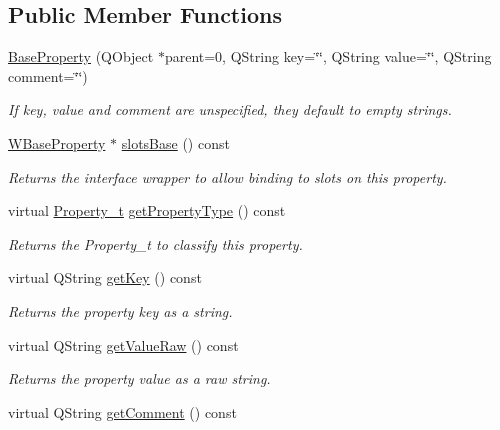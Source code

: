 \subsection*{Public Member Functions}
\begin{DoxyCompactItemize}
\item 
\hyperlink{class_base_property_aca37cc72811875adbb8a5f5f91e521a2}{Base\-Property} (Q\-Object $\ast$parent=0, Q\-String key=\char`\"{}\char`\"{}, Q\-String value=\char`\"{}\char`\"{}, Q\-String comment=\char`\"{}\char`\"{})
\begin{DoxyCompactList}\small\item\em If key, value and comment are unspecified, they default to empty strings. \end{DoxyCompactList}\item 
\hyperlink{class_w_base_property}{W\-Base\-Property} $\ast$ \hyperlink{class_base_property_a032130dea4bd72ee8dd80dcfa7d5f37a}{slots\-Base} () const 
\begin{DoxyCompactList}\small\item\em Returns the interface wrapper to allow binding to slots on this property. \end{DoxyCompactList}\item 
virtual \hyperlink{group___property_classes_ga38f1ccddda12c7cb50b868c9f789ee37}{Property\-\_\-t} \hyperlink{class_base_property_a85239fb7297edb01c3176e4ce1b11132}{get\-Property\-Type} () const 
\begin{DoxyCompactList}\small\item\em Returns the Property\-\_\-t to classify this property. \end{DoxyCompactList}\item 
virtual Q\-String \hyperlink{class_base_property_a7b5d5d1009130976d7a53720c6c8dab7}{get\-Key} () const 
\begin{DoxyCompactList}\small\item\em Returns the property key as a string. \end{DoxyCompactList}\item 
virtual Q\-String \hyperlink{class_base_property_a9656d6fa643734ae606fd613349e8f40}{get\-Value\-Raw} () const 
\begin{DoxyCompactList}\small\item\em Returns the property value as a raw string. \end{DoxyCompactList}\item 
virtual Q\-String \hyperlink{class_base_property_a77b2576711cabd4b4f0b39ae79868ebf}{get\-Comment} () const 

\end{DoxyCompactItemize}
